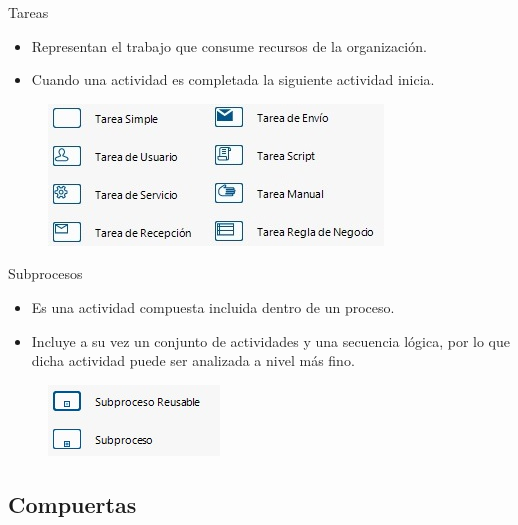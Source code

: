 \begin{frame}{Tareas}
    \begin{itemize}
        \item Representan el trabajo que consume recursos de la organización.
        \item Cuando una actividad es completada la siguiente actividad inicia.
    \end{itemize}
    \begin{figure}
        \centering
        \includegraphics[scale=0.8]{images/task.jpg}
    \end{figure}
\end{frame}

\begin{frame}{Subprocesos}
    \begin{itemize}
        \item Es una actividad compuesta incluida dentro de un proceso.
        \item Incluye a su vez un conjunto de actividades y una secuencia lógica, por lo que dicha actividad puede ser analizada a nivel más fino.
    \end{itemize}
    \begin{figure}
        \centering
        \includegraphics[scale=0.8]{images/subprocess.jpg}
    \end{figure}
\end{frame}

\subsection{Compuertas}

